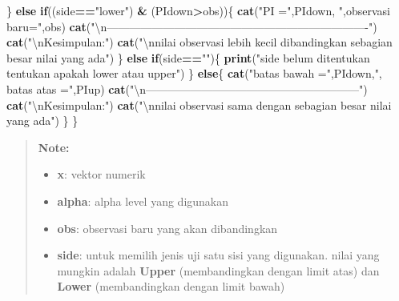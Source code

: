 \documentclass[]{book}
\newenvironment{Shaded}{\begin{snugshade}}{\end{snugshade}}
\newcommand{\KeywordTok}[1]{\textcolor[rgb]{0.13,0.29,0.53}{\textbf{#1}}}
\newcommand{\CharTok}[1]{\textcolor[rgb]{0.31,0.60,0.02}{#1}}
\newcommand{\StringTok}[1]{\textcolor[rgb]{0.31,0.60,0.02}{#1}}
\newcommand{\ControlFlowTok}[1]{\textcolor[rgb]{0.13,0.29,0.53}{\textbf{#1}}}
\newcommand{\OperatorTok}[1]{\textcolor[rgb]{0.81,0.36,0.00}{\textbf{#1}}}
\newcommand{\NormalTok}[1]{#1}
\providecommand{\tightlist}{%
  \setlength{\itemsep}{0pt}\setlength{\parskip}{0pt}}
\begin{document}
\begin{Shaded}
\begin{Highlighting}[]
\NormalTok{  \} }\ControlFlowTok{else} \ControlFlowTok{if}\NormalTok{((side}\OperatorTok{==}\StringTok{"lower"}\NormalTok{) }\OperatorTok{&}\StringTok{ }\NormalTok{(PIdown}\OperatorTok{>}\NormalTok{obs))\{}
    \KeywordTok{cat}\NormalTok{(}\StringTok{"PI ="}\NormalTok{,PIdown, }\StringTok{",observasi baru="}\NormalTok{,obs)}
    \KeywordTok{cat}\NormalTok{(}\StringTok{"}\CharTok{\textbackslash{}n}\StringTok{----------------------------------------------------------------------"}\NormalTok{)}
    \KeywordTok{cat}\NormalTok{(}\StringTok{"}\CharTok{\textbackslash{}n}\StringTok{Kesimpulan:"}\NormalTok{)}
    \KeywordTok{cat}\NormalTok{(}\StringTok{"}\CharTok{\textbackslash{}n}\StringTok{nilai observasi lebih kecil dibandingkan sebagian besar nilai yang ada"}\NormalTok{)}
\NormalTok{  \} }\ControlFlowTok{else} \ControlFlowTok{if}\NormalTok{(side}\OperatorTok{==}\StringTok{""}\NormalTok{)\{}
    \KeywordTok{print}\NormalTok{(}\StringTok{"side belum ditentukan tentukan apakah lower atau upper"}\NormalTok{)}
\NormalTok{  \} }\ControlFlowTok{else}\NormalTok{\{}
    \KeywordTok{cat}\NormalTok{(}\StringTok{"batas bawah ="}\NormalTok{,PIdown,}\StringTok{", batas atas ="}\NormalTok{,PIup)}
    \KeywordTok{cat}\NormalTok{(}\StringTok{"}\CharTok{\textbackslash{}n}\StringTok{---------------------------------------------------------"}\NormalTok{)}
    \KeywordTok{cat}\NormalTok{(}\StringTok{"}\CharTok{\textbackslash{}n}\StringTok{Kesimpulan:"}\NormalTok{)}
    \KeywordTok{cat}\NormalTok{(}\StringTok{"}\CharTok{\textbackslash{}n}\StringTok{nilai observasi sama dengan sebagian besar nilai yang ada"}\NormalTok{)}
\NormalTok{  \}}
\NormalTok{\}}
\end{Highlighting}
\end{Shaded}

\begin{quote}
\textbf{Note: }

\begin{itemize}
\tightlist
\item
  \textbf{x}: vektor numerik
\item
  \textbf{alpha}: alpha level yang digunakan
\item
  \textbf{obs}: observasi baru yang akan dibandingkan
\item
  \textbf{side}: untuk memilih jenis uji satu sisi yang digunakan. nilai
  yang mungkin adalah \textbf{Upper} (membandingkan dengan limit atas)
  dan \textbf{Lower} (membandingkan dengan limit bawah)
\end{itemize}
\end{quote}
\end{document}
